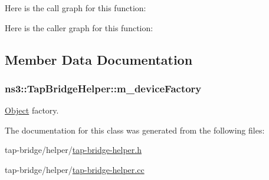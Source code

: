 Here is the call graph for this function\+:




Here is the caller graph for this function\+:




\subsection{Member Data Documentation}
\subsubsection[{\texorpdfstring{m\+\_\+device\+Factory}{m_deviceFactory}}]{ ns3\+::\+Tap\+Bridge\+Helper\+::m\+\_\+device\+Factory\hspace{0.3cm}{\ttfamily [private]}}\hypertarget{classns3_1_1TapBridgeHelper_af0c52ee5ae87f28a028f7b876681b75d}{}\label{classns3_1_1TapBridgeHelper_af0c52ee5ae87f28a028f7b876681b75d}


\hyperlink{classns3_1_1Object}{Object} factory. 



The documentation for this class was generated from the following files\+:\begin{DoxyCompactItemize}
\item 
tap-\/bridge/helper/\hyperlink{tap-bridge-helper_8h}{tap-\/bridge-\/helper.\+h}\item 
tap-\/bridge/helper/\hyperlink{tap-bridge-helper_8cc}{tap-\/bridge-\/helper.\+cc}\end{DoxyCompactItemize}
